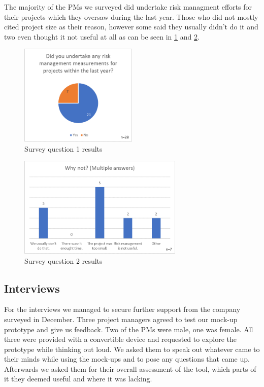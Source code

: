 The majority of the PMs we surveyed did undertake risk managment efforts for their projects which they oversaw during the last year. Those who did not mostly cited project size as their reason, however some said they usually didn't do it and two even thought it not useful at all as can be seen in \ref{fig:label20} and \ref{fig:label21}.
\begin{figure}[H]
	\centering
	\includegraphics[width=0.5\textwidth]{Assets/survey_results/Q1.png}
	\caption{Survey question 1 results}
	\label{fig:label20}
\end{figure}
\begin{figure}[H]
	\centering
	\includegraphics[width=0.7\textwidth]{Assets/survey_results/Q2.png}
	\caption{Survey question 2 results}
	\label{fig:label21}
\end{figure}

\subsection{Interviews}
\label{sec:DomainAb}
For the interviews we managed to secure further support from the company surveyed in December. Three project managers agreed to test our mock-up prototype and give us feedback. Two of the PMs were male, one was female. All three were provided with a convertible device and requested to explore the prototype while thinking out loud. We asked them to speak out whatever came to their minds while using the mock-ups and to pose any questions that came up. Afterwards we asked them for their overall assessment of the tool, which parts of it they deemed useful and where it was lacking.

